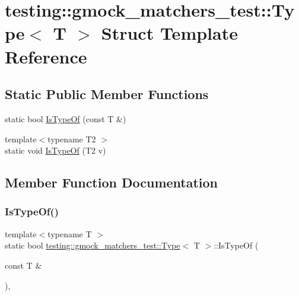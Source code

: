 \hypertarget{structtesting_1_1gmock__matchers__test_1_1_type}{}\section{testing\+:\+:gmock\+\_\+matchers\+\_\+test\+:\+:Type$<$ T $>$ Struct Template Reference}
\label{structtesting_1_1gmock__matchers__test_1_1_type}
\subsection*{Static Public Member Functions}
\begin{DoxyCompactItemize}
\item 
static bool \hyperlink{structtesting_1_1gmock__matchers__test_1_1_type_ad0b8d166a185471db49aa9009520d74f}{Is\+Type\+Of} (const T \&)
\item 
{\footnotesize template$<$typename T2 $>$ }\\static void \hyperlink{structtesting_1_1gmock__matchers__test_1_1_type_a5451b10be4ff47bd2dc3741eb70dde59}{Is\+Type\+Of} (T2 v)
\end{DoxyCompactItemize}


\subsection{Member Function Documentation}
\mbox{\label{structtesting_1_1gmock__matchers__test_1_1_type_ad0b8d166a185471db49aa9009520d74f}} 
\subsubsection{\texorpdfstring{Is\+Type\+Of()}{IsTypeOf()}\hspace{0.1cm}{\footnotesize\ttfamily [1/2]}}
{\footnotesize\ttfamily template$<$typename T $>$ \\
static bool \hyperlink{structtesting_1_1gmock__matchers__test_1_1_type}{testing\+::gmock\+\_\+matchers\+\_\+test\+::\+Type}$<$ T $>$\+::Is\+Type\+Of (\begin{DoxyParamCaption}\item[{const T \&}]{ }\end{DoxyParamCaption})\hspace{0.3cm}{\ttfamily [inline]}, {\ttfamily [static]}}


